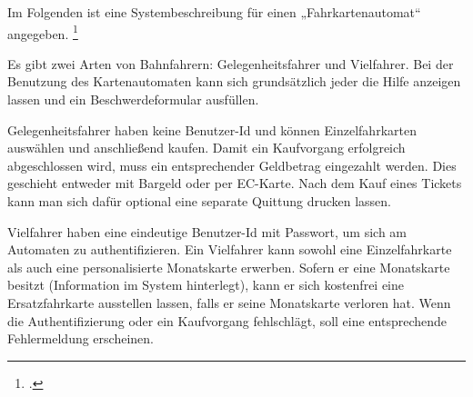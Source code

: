 \documentclass{bschlangaul-aufgabe}
\begin{document}

Im Folgenden ist eine Systembeschreibung für einen „Fahrkartenautomat“
angegeben.
\footcite{examen:66116:2020:09}

Es gibt zwei Arten von Bahnfahrern: Gelegenheitsfahrer und Vielfahrer.
Bei der Benutzung des Kartenautomaten kann sich grundsätzlich jeder die
Hilfe anzeigen lassen und ein Beschwerdeformular ausfüllen.

Gelegenheitsfahrer haben keine Benutzer-Id und können Einzelfahrkarten
auswählen und anschließend kaufen. Damit ein Kaufvorgang erfolgreich
abgeschlossen wird, muss ein entsprechender Geldbetrag eingezahlt
werden. Dies geschieht entweder mit Bargeld oder per EC-Karte. Nach dem
Kauf eines Tickets kann man sich dafür optional eine separate Quittung
drucken lassen.

Vielfahrer haben eine eindeutige Benutzer-Id mit Passwort, um sich am
Automaten zu authentifizieren. Ein Vielfahrer kann sowohl eine
Einzelfahrkarte als auch eine personalisierte Monatskarte erwerben.
Sofern er eine Monatskarte besitzt (Information im System hinterlegt),
kann er sich kostenfrei eine Ersatzfahrkarte ausstellen lassen, falls er
seine Monatskarte verloren hat. Wenn die Authentifizierung oder ein
Kaufvorgang fehlschlägt, soll eine entsprechende Fehlermeldung
erscheinen.
\end{document}
